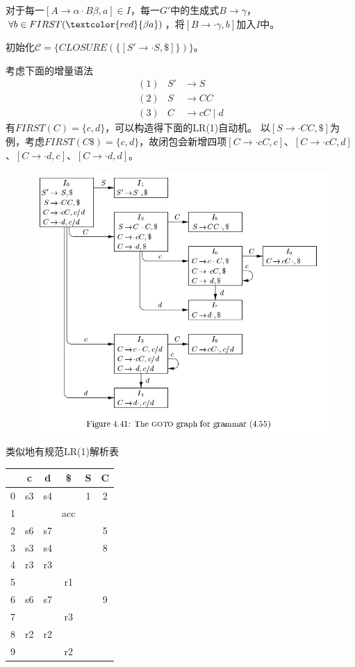 \begin{myalgorithm}[计算$CLOSURE(I)$]
对于每一$[A\to\alpha\cdot B\beta,a]\in I$，每一$G'$中的生成式$B\to\gamma$，$\forall b\in FIRST(\textcolor{red}{\beta a})$，将$[B\to\cdot\gamma,b]$加入$I$中。

初始化$\mathcal{C}=\{CLOSURE(\{[S'\to\cdot S,\$]\})\}$。
\end{myalgorithm}
\begin{example}
考虑下面的增量语法
\[\begin{array}{rrl}
(1) & S' &\to S\\
(2) & S &\to C C\\
(3) & C &\to c C\mid d
\end{array}\]
有$FIRST(C)=\{c,d\}$，可以构造得下面的LR(1)自动机。
以$[S\to\cdot CC,\$]$为例，考虑$FIRST(C\$)=\{c,d\}$，故闭包会新增四项$[C\to\cdot cC,c]$、$[C\to\cdot cC,d]$、$[C\to\cdot d,c]$、$[C\to\cdot d,d]$。
\begin{figure}[H]
\centering
\includegraphics[width=0.8\linewidth]{fig/LR1-eg.jpg}
\end{figure}
类似地有规范LR(1)解析表
\begin{center}
\begin{tabular}{|c|c|c|c|c|c|}\hline
  & c  & d  & \$  & S & C \\\hline
0 & s3 & s4 &     & 1 & 2 \\\hline
1 &    &    & acc &   &   \\\hline
2 & s6 & s7 &     &   & 5 \\\hline
3 & s3 & s4 &     &   & 8 \\\hline
4 & r3 & r3 &     &   &   \\\hline
5 &    &    & r1  &   &   \\\hline
6 & s6 & s7 &     &   & 9 \\\hline
7 &    &    & r3  &   &   \\\hline
8 & r2 & r2 &     &   &   \\\hline
9 &    &    & r2  &   &   \\\hline
\end{tabular}
\end{center}
\end{example}

